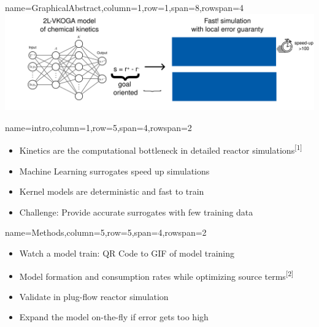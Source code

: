 \documentclass[
	accentcolor=3c,
	boxstyle=colored, %
	colorback=false,
	title=small
	]{tudasciposter}
\begin{document}
\begin{tcbposter}[
	poster={
		columns=8,
		rows=12,
		spacing=1cm,
	},]

\begin{posterboxenv}{name=GraphicalAbstract,column=1,row=1,span=8,rowspan=4}
	\centering
	\includegraphics[width=\textwidth]{abb/GA_draft}
\end{posterboxenv}

\begin{posterboxenv}[title=1. Introduction]{name=intro,column=1,row=5,span=4,rowspan=2}
	\begin{itemize}
		\item Kinetics are the computational bottleneck in detailed reactor simulations\textsuperscript{[1]}
		\item Machine Learning surrogates speed up simulations
		\item Kernel models are deterministic and fast to train 
		\item Challenge: Provide accurate surrogates with few training data
	\end{itemize}
\end{posterboxenv}

\begin{posterboxenv}[title=2. Methods]{name=Methods,column=5,row=5,span=4,rowspan=2}
	\begin{itemize}
		\item Watch a model train: QR Code to GIF of model training
		\item Model formation and consumption rates while optimizing source terms\textsuperscript{[2]}
		\item Validate in plug-flow reactor simulation
		\item Expand the model on-the-fly if error gets too high
	\end{itemize}


\end{posterboxenv}
\end{tcbposter}
\end{document}
